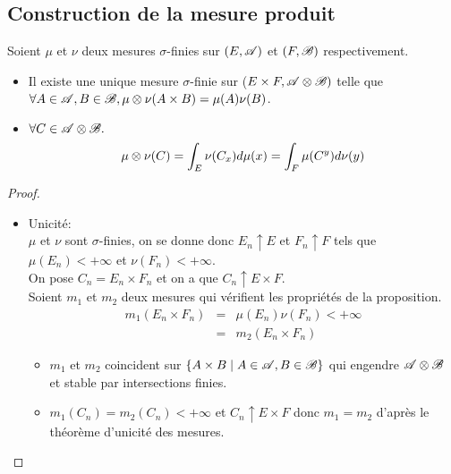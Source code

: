 \subsection{Construction de la mesure produit}

\begin{theorem}
	Soient $\mu$ et $\nu$ deux mesures $\sigma$-finies sur $(E, \mathscr{A})$ et $(F, \mathscr{B})$ respectivement.

	\begin{itemize}
		\item Il existe une unique mesure $\sigma$-finie sur ($E \times F, \mathscr{A} \otimes \mathscr{B})$ telle que $\forall A \in \mathscr{A}, B \in \mathscr{B}, \mu \otimes \nu(A \times B) = \mu(A) \nu(B)$.
		\item $\forall C \in \mathscr{A} \otimes \mathscr{B}. $
		      $$ \mu \otimes \nu(C) = \int_E \nu(C_x) d \mu(x) = \int_F \mu(C^y) d \nu(y) $$
	\end{itemize}
\end{theorem}

\begin{proof}
	\begin{itemize}
		\item  Unicité:\\
		      $\mu$ et $\nu$ sont $\sigma$-finies, on se donne donc $E_n \uparrow E$ et $F_n \uparrow F$ tels que $\mu(E_n) < +\infty$ et $\nu(F_n) < +\infty$.\\
		      On pose $C_n = E_n \times F_n$ et on a que $C_n \uparrow E \times F$.\\
		      Soient $m_1$ et $m_2$ deux mesures qui vérifient les propriétés de la proposition.\\
		      \begin{eqnarray*}
			      m_1(E_n \times F_n) &=& \mu(E_n) \nu(F_n) < +\infty \\
			      & = & m_2(E_n \times F_n)
		      \end{eqnarray*}

		      \begin{itemize}
			      \item $m_1$ et $m_2$ coincident sur $\left\{A \times B \mid A \in \mathscr{A}, B \in \mathscr{B}\right\}$ qui engendre $\mathscr{A} \otimes \mathscr{B}$ et stable par intersections finies.
			      \item $m_1 (C_n) = m_2(C_n) < +\infty$ et $C_n \uparrow E \times F$ donc $m_1 = m_2$ d'après le théorème d'unicité des mesures.
		      \end{itemize}
	\end{itemize}
\end{proof}

